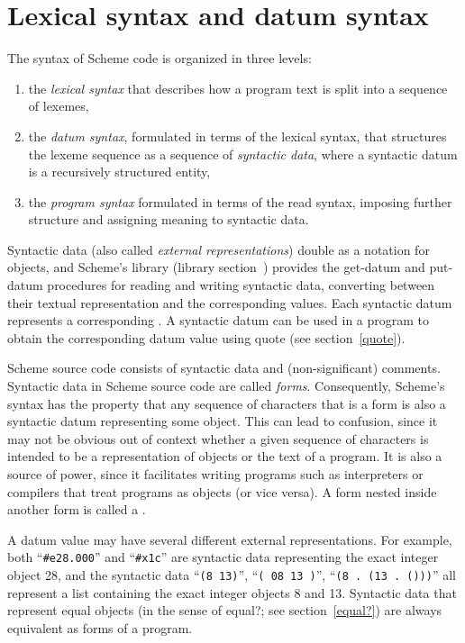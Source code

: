\chapter{Lexical syntax and datum syntax}
\label{readsyntaxchapter}

The syntax of Scheme code is organized in three levels:
%
\begin{enumerate}
\item the \textit{lexical syntax} that describes how a program text is split
  into a sequence of lexemes,
\item the \textit{datum syntax}, formulated in terms of the lexical
  syntax, that structures the lexeme sequence as a sequence of
  \textit{syntactic data}, where a syntactic datum is
    a recursively structured entity,
\item the \textit{program syntax} formulated in terms of the read
  syntax, imposing further structure and assigning meaning to
  syntactic data.
\end{enumerate}
%
Syntactic data (also called \textit{external
  representations}) double
as a notation for objects, and Scheme's  library
(library section~)
provides the {\cf get-datum} and {\cf put-datum} procedures
for reading and writing syntactic data, converting between their
textual representation and the corresponding values. 
Each syntactic datum represents a corresponding .
A syntactic datum can be used in a program to obtain the corresponding
datum value using {\cf quote} (see section~\ref{quote}).

Scheme source code consists of syntactic data and (non-significant) comments.
Syntactic data in Scheme source code are called
\textit{forms}.
Consequently, Scheme's syntax has the property that any sequence of
characters that is a form is also a syntactic datum representing
some object.  This can lead to confusion, since it may not be obvious
out of context whether a given sequence of characters is intended to
be a representation of objects or the text of a program.
It is also a source of power, since it
facilitates writing programs such as interpreters or compilers that
treat programs as objects (or vice versa).  A form nested inside another form is
called a .

A datum value may have several different external representations.
For example, both ``{\tt \#e28.000}'' and
``{\tt\#x1c}'' are syntactic data representing the exact integer
object 28, and the syntactic data ``{\tt(8 13)}'', ``{\tt( 08 13 )}'', ``{\tt(8 .\
  (13 .\ ()))}''
all represent a list containing the exact integer objects 8 and 13. 
Syntactic data that represent equal objects (in the sense of {\cf
  equal?}; see section~\ref{equal?}) are always equivalent 
as forms of a program.

